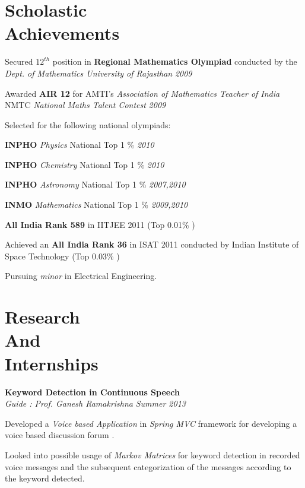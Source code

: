 \documentclass[margin,11pt]{resume}
\begin{document}
\begin{resume}

\vspace{25mm}

\section{\mysidestyle Scholastic\\Achievements}

\begin{list2}
\item Secured $12^{th}$ position in \textbf{Regional Mathematics Olympiad} conducted by the \emph{Dept. of Mathematics University of Rajasthan} \hfill \emph{2009}
\item Awarded \textbf{AIR 12} for AMTI's \emph{Association of Mathematics Teacher of India} NMTC \emph{National Maths Talent Contest} \hfill \emph{2009}
\item Selected for the following national olympiads:
\begin{list2}
\item \textbf{INPHO} \emph{Physics} National Top 1 \% \hfill \emph{2010}
\item \textbf{INPHO} \emph{Chemistry} National Top 1 \% \hfill \emph{2010}
\item \textbf{INPHO} \emph{Astronomy} National Top 1 \% \hfill \emph{2007,2010}
\item \textbf{INMO} \emph{Mathematics} National Top 1 \% \hfill \emph{2009,2010}
\end{list2}
\vspace{2mm}
\item \textbf{All India Rank 589} in IITJEE 2011 (Top 0.01\% )
\item Achieved an \textbf{All India Rank 36} in ISAT 2011 conducted by Indian Institute of Space Technology (Top 0.03\% )
\item Pursuing \emph{minor} in Electrical Engineering.
\end{list2}\vspace{0.25mm}
\section{\mysidestyle Research\\And\\Internships }
\textbf{Keyword Detection in Continuous Speech} \\
    \textsl{Guide : Prof. Ganesh Ramakrishna} \hfill \emph{Summer 2013}
\begin{list2}
\item Developed a \emph{Voice based Application} in \emph{Spring MVC} framework for developing a voice based discussion forum . 
\item Looked into possible usage of \emph{Markov Matrices} for keyword detection in recorded voice messages and the subsequent categorization of the messages according to the keyword detected.
\end{list2}


\end{resume}
\end{document}
